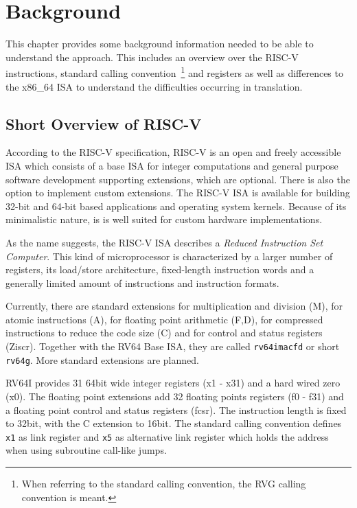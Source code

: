 \documentclass[course=eragp]{aspdoc}
\begin{document}
\section{Background}\label{sec:background}

This chapter provides some background information needed to be able to understand the approach. This
includes an overview over the RISC-V instructions, standard calling convention~\footnote{When
    referring to the standard calling convention, the RVG calling convention is meant.} and registers
as well as differences to the x86\_64 ISA to understand the difficulties occurring in translation.

\subsection{Short Overview of RISC-V}

According to the RISC-V specification, RISC-V is an open and freely accessible ISA
which consists of a base ISA for integer computations and general purpose software development
supporting extensions, which are optional. There is also the
option to implement custom extensions. The RISC-V ISA is available for building 32-bit and 64-bit based
applications and operating system kernels. Because of its minimalistic nature, is is well suited for
custom hardware implementations.~\cite{rvspec}

\par

As the name suggests, the
RISC-V ISA describes a \emph{Reduced Instruction Set Computer}. This kind of microprocessor is
characterized by a larger number of
registers, its load/store architecture, fixed-length instruction words and a generally limited
amount of instructions and instruction formats.~\cite{RISCvCISC}

\par

Currently, there are standard extensions for multiplication and division (M), for atomic
instructions (A), for floating point arithmetic (F,D), for compressed instructions to reduce the
code size (C) and for control and status registers (Ziscr). Together with the RV64 Base
ISA, they are called \texttt{rv64imacfd} or short \texttt{rv64g}. More standard extensions are planned.~\cite{rvspec}

\par

RV64I provides 31 64bit wide integer registers (x1 - x31) and a hard wired zero (x0). The floating
point extensions add 32 floating points registers (f0 - f31) and a floating point control and status
registers (fcsr). The instruction length is fixed to 32bit, with the C extension to 16bit. The
standard calling convention defines \texttt{x1} as link register and \texttt{x5} as alternative link
register which holds the address when using subroutine call-like jumps.~\cite{rvspec}
\end{document}

